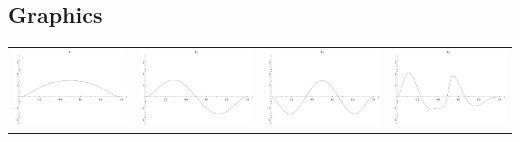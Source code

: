 \documentclass{article}
\begin{document}
\begin{landscape}
\subsection{Graphics}
\begin{tabular}{cccc}
\includegraphics[width=5.0cm]{sextic_bspline_1.pdf}& \includegraphics[width=5.0cm]{sextic_bspline_2.pdf}& \includegraphics[width=5.0cm]{sextic_bspline_3.pdf}& \includegraphics[width=5.0cm]{sextic_bspline_4.pdf} \\

\end{tabular}
\end{landscape}
\end{document}

